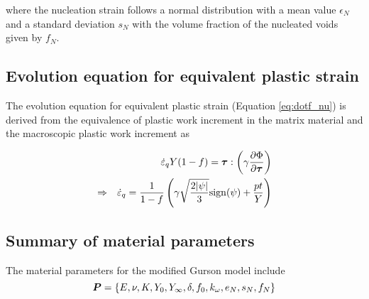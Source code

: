 where the nucleation strain follows a normal distribution with a mean value $\epsilon_N$ and a standard deviation $s_N$ with the volume fraction of the nucleated voids given by $f_N$.\\

\subsection{Evolution equation for equivalent plastic strain}
The evolution equation for equivalent plastic strain (Equation \eqref{eq:dotf_nu}) is derived from the equivalence of plastic work increment in the matrix material and the macroscopic plastic work increment as

\begin{eqnarray}\label{eq:dotepsilon}
&&\dot{\varepsilon}_q Y(1-f) = {\boldsymbol{\tau}} : \left( \gamma\frac{\partial\Phi}{\partial{\boldsymbol{\tau}}} \right)\\
\Rightarrow &&\dot{\varepsilon}_q =\frac{1}{1-f}\left( \gamma\sqrt{\frac{2|\psi|}{3}} {\rm sign}(\psi) + \frac{p t}{Y} \right) 
\end{eqnarray}

\subsection{Summary of material parameters}
The material parameters for the modified Gurson model include
\begin{equation}
{\boldsymbol{P}} = \left\lbrace  E, \nu, K, Y_0, Y_{\infty}, \delta, f_0, k_{\omega}, e_N, s_N, f_N\right\rbrace 
\end{equation}

